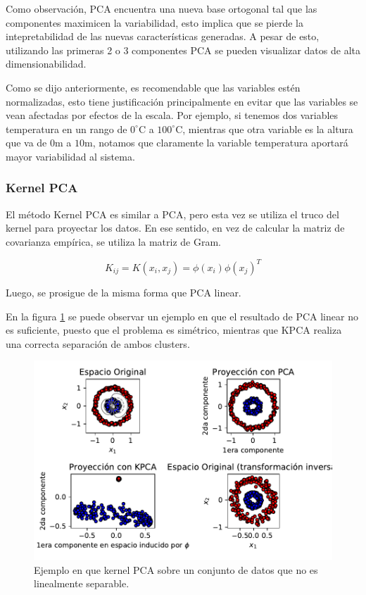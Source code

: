 Como observación, PCA encuentra una nueva base ortogonal tal que las componentes maximicen la variabilidad, esto implica que se pierde la intepretabilidad de las nuevas características generadas. A pesar de esto, utilizando las primeras 2 o 3 componentes PCA se pueden visualizar datos de alta dimensionabilidad.

Como se dijo anteriormente, es recomendable que las variables estén normalizadas, esto tiene justificación principalmente en evitar que las variables se vean afectadas por efectos de la escala. Por ejemplo, si tenemos dos variables temperatura en un rango de $0^\circ$C a $100^\circ$C, mientras que otra variable es la altura que va de $0$m a $10$m, notamos que claramente la variable temperatura aportará mayor variabilidad al sistema.
\subsubsection{Kernel PCA}
El método Kernel PCA es similar a PCA, pero esta vez se utiliza el truco del kernel para proyectar los datos. En ese sentido, en vez de calcular la matriz de covarianza empírica, se utiliza la matriz de Gram.

$$
K_{ij} = K(x_i,x_j) = \phi(x_i)\phi(x_j)^T
$$

Luego, se prosigue de la misma forma que PCA linear.

En la figura \ref{fig:kpca} se puede observar un ejemplo en que el resultado de PCA linear no es suficiente, puesto que el problema es simétrico, mientras que KPCA realiza una correcta separación de ambos clusters.

\begin{figure}[ht]
    \centering
    \includegraphics[width=0.7\linewidth]{img/kpca.pdf}
    \caption{Ejemplo en que kernel PCA sobre un conjunto de datos que no es linealmente separable.}
    \label{fig:kpca}
\end{figure}

